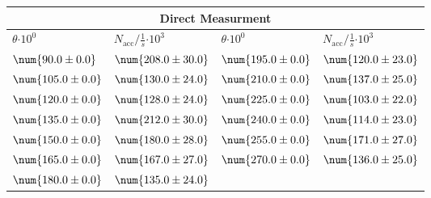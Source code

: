 \begin{tabular}{|p{}|p{}||p{}|p{}|}
\hline
\multicolumn{4}{|c|}{Direct Measurment}\\
\hline
$\theta$$\cdot 10^{0}$&$N_\text{acc}/\frac{1}{s}$$\cdot 10^{3}$&$\theta$$\cdot 10^{0}$&$N_\text{acc}/\frac{1}{s}$$\cdot 10^{3}$\\
\hline
$\num{90.0\pm 0.0}$&$\num{208.0\pm 30.0}$&$\num{195.0\pm 0.0}$&$\num{120.0\pm 23.0}$\\
$\num{105.0\pm 0.0}$&$\num{130.0\pm 24.0}$&$\num{210.0\pm 0.0}$&$\num{137.0\pm 25.0}$\\
$\num{120.0\pm 0.0}$&$\num{128.0\pm 24.0}$&$\num{225.0\pm 0.0}$&$\num{103.0\pm 22.0}$\\
$\num{135.0\pm 0.0}$&$\num{212.0\pm 30.0}$&$\num{240.0\pm 0.0}$&$\num{114.0\pm 23.0}$\\
$\num{150.0\pm 0.0}$&$\num{180.0\pm 28.0}$&$\num{255.0\pm 0.0}$&$\num{171.0\pm 27.0}$\\
$\num{165.0\pm 0.0}$&$\num{167.0\pm 27.0}$&$\num{270.0\pm 0.0}$&$\num{136.0\pm 25.0}$\\
$\num{180.0\pm 0.0}$&$\num{135.0\pm 24.0}$&&\\
\hline
\end{tabular}
